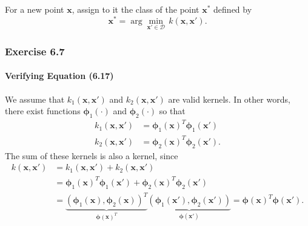 \documentclass[12pt, a4paper]{article}
\newcommand{\D}{\mathcal{D}}
\newcommand{\vect}[1]{\bm{#1}}
\begin{document}
For a new point $\vect{x}$, assign to it the class of the point $\vect{x}^*$ defined by
\begin{equation*}
	\vect{x}^* = \arg \min_{\vect{x}' \in \D} \, k(\vect{x}, \vect{x}').
\end{equation*}



\subsubsection*{Exercise 6.7}
\paragraph{Verifying Equation (6.17)}
We assume that $k_1(\vect{x}, \vect{x}')$ and $k_2(\vect{x}, \vect{x}')$ are valid kernels.
In other words, there exist functions $\vect{\phi}_1(\cdot)$ and $\vect{\phi}_2(\cdot)$ so that
\begin{align*}
	k_1(\vect{x}, \vect{x}') &=
	\vect{\phi}_1 \left( \vect{x} \right)^T \vect{\phi}_1 \left( \vect{x}' \right) \\
	k_2(\vect{x}, \vect{x}') &=
	\vect{\phi}_2 \left( \vect{x} \right)^T \vect{\phi}_2 \left( \vect{x}' \right).
\end{align*}
The sum of these kernels is also a kernel, since
\begin{align*}
	k(\vect{x}, \vect{x}') 
	&= k_1(\vect{x}, \vect{x}') + k_2(\vect{x}, \vect{x}') \\
	&= \vect{\phi}_1 \left( \vect{x} \right)^T \vect{\phi}_1 \left( \vect{x}' \right)
	+ \vect{\phi}_2 \left( \vect{x} \right)^T \vect{\phi}_2 \left( \vect{x}' \right) \\
	&= \underbrace{\left( \vect{\phi}_1 \left( \vect{x} \right) , \vect{\phi}_2 \left( \vect{x} \right) \right)^T}_{\vect{\phi}(\vect{x})^T}
	\underbrace{\left( \vect{\phi}_1 \left( \vect{x}' \right) , \vect{\phi}_2 \left( \vect{x}' \right) \right)}_{\vect{\phi}(\vect{x}')}
	= \vect{\phi}(\vect{x})^T \vect{\phi}(\vect{x}').
\end{align*}
\end{document}
